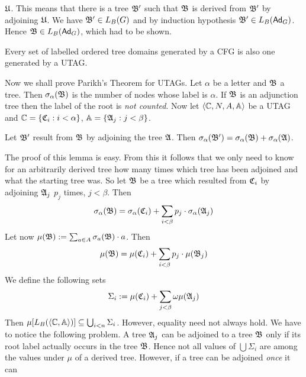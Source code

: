 $\mathfrak{U}$. This means that there is a tree $\mathfrak{B}'$ such that $\mathfrak{B}$
is derived from $\mathfrak{B}'$ by adjoining $\mathfrak{U}$. We have $\mathfrak{B}' \in L_B(G)$
and by induction hypothesis $\mathfrak{B}' \in L_B(\mathsf{Ad}_G)$.
Hence $\mathfrak{B} \in L_B(\mathsf{Ad}_G)$, which had to be shown.
\nocite{joshilevytakahashi:adjunct}
\begin{thm}
Every set of labelled ordered tree domains generated by a
CFG is also one generated by a UTAG.
\proofend
\end{thm}
Now we shall prove Parikh's Theorem for UTAGs.
Let $\alpha$ be a letter and $\mathfrak{B}$ a tree. Then 
$\sigma_{\alpha}(\mathfrak{B})$ 
is the number of nodes whose label 
is $\alpha$. If $\mathfrak{B}$ is an adjunction tree then the label 
of the root is {\it not counted}. Now let $\langle \mathbb{C}, N, A, \mathbb{A}\rangle$ 
be a UTAG and $\mathbb{C} = \{\mathfrak{C}_i : i < \alpha\}$, $\mathbb{A} = \{\mathfrak{A}_j : j < \beta\}$.
\begin{lem}
Let $\mathfrak{B}'$ result from $\mathfrak{B}$ by adjoining the tree
$\mathfrak{A}$. Then $\sigma_{\alpha}(\mathfrak{B}') = \sigma_{\alpha}(\mathfrak{B})
+ \sigma_{\alpha}(\mathfrak{A})$.
\end{lem}
The proof of this lemma is easy. From this it follows that
we only need to know for an arbitrarily derived tree how
many times which tree has been adjoined and what the starting
tree was. So let $\mathfrak{B}$ be a tree which resulted from $\mathfrak{C}_i$
by adjoining $\mathfrak{A}_j$ $p_j$ times, $j < \beta$. Then
\begin{equation}\sigma_{\alpha}(\mathfrak{B}) = \sigma_{\alpha}(\mathfrak{C}_i) +
\sum_{i < \beta} p_j \cdot \sigma_{\alpha}(\mathfrak{A}_j)
\end{equation}
Let now $\mu(\mathfrak{B}) := \sum_{a \in A} \sigma_a(\mathfrak{B}) \cdot a$.
Then 
\begin{equation}
\mu(\mathfrak{B}) = \mu(\mathfrak{C}_i) + \sum_{i < \beta} p_j \cdot \mu(\mathfrak{B}_j)
\end{equation}
We define the following sets
\begin{equation}
\Sigma_i := \mu(\mathfrak{C}_i) + \sum_{j < \beta} \omega \mu(\mathfrak{A}_j) 
\end{equation}
Then $\mu[L_B(\langle \mathbb{C}, \mathbb{A}\rangle)] \subseteq \bigcup_{i < n} \Sigma_i$.
However, equality need not always hold. We have to notice the following
problem. A tree $\mathfrak{A}_j$ can be adjoined to a tree $\mathfrak{B}$ only if its root
label actually occurs in the tree $\mathfrak{B}$. Hence not all values of
$\bigcup \Sigma_i$ are among the values under $\mu$ of a derived
tree. However, if a tree can be adjoined {\it once\/} it can
